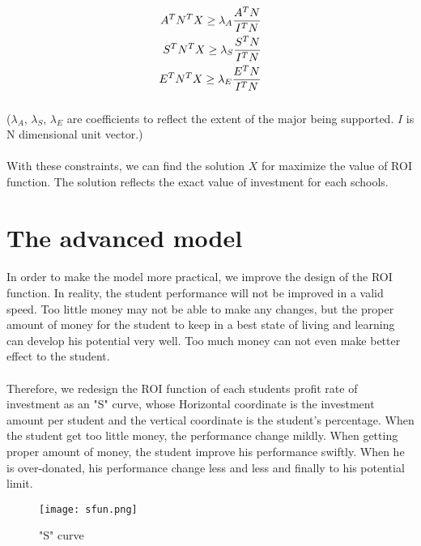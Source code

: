 \documentclass{mcmthesis}
\begin{document}
\begin{align}
A^T\*N^T\*X\geq\lambda_A\*\frac{A^T\*N}{I^T\*N}\\
S^T\*N^T\*X\geq\lambda_S\*\frac{S^T\*N}{I^T\*N}\\
E^T\*N^T\*X\geq\lambda_E\*\frac{E^T\*N}{I^T\*N}\\
\end{align}

\subparagraph{} ($\lambda_A$, $\lambda_S$, $\lambda_E$ are coefficients to reflect the extent of the major being supported. $I$ is N dimensional unit vector.)
\paragraph{} With these constraints, we can find the solution $X$ for maximize the value of ROI function. The solution reflects the exact value of investment for each schools. 

\section{The advanced model} 
\paragraph{} In order to make the model more practical, we improve the design of the ROI function. In reality, the student performance will not be improved in a valid speed. Too little money may not be able to make any changes, but the proper amount of money for the student to keep in a best state of living and learning can develop his potential very well. Too much money can not even make better effect to the student.
\paragraph{} Therefore, we redesign the ROI function of each students profit rate of investment as an "S" curve, whose Horizontal coordinate is the investment amount per student and the vertical coordinate is the student's percentage. When the student get too little money, the performance change mildly. When getting proper amount of money, the student improve his performance swiftly. When he is over-donated, his performance change less and less and finally to his potential limit.

\begin{figure}
\centering
\texttt{[image: sfun.png]}
\caption{"S" curve}
\label{arch}
\end{figure}
\end{document}

